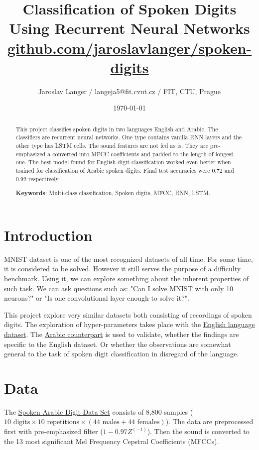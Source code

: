 \documentclass[a4paper,10pt]{article}
\title{Classification of Spoken Digits \\
       \vspace{0.05cm}
       \Large{Using Recurrent Neural Networks} \\
       \vspace{0.2cm}
       \normalsize{\href{https://github.com/jaroslavlanger/spoken-digits}{github.com/jaroslavlanger/spoken-digits}}
}
\date{\today}
\author{Jaroslav Langer / langeja5@fit.cvut.cz / FIT, CTU, Prague}
\begin{document}
\maketitle

\begin{abstract}

This project classifies spoken digits in two languages English and Arabic.
The classifiers are recurrent neural networks.
One type contains vanilla RNN layers and the other type has LSTM cells.
The sound features are not fed as is.
They are pre-emphasized a converted into MFCC coefficients and padded to the length of longest one.
The best model found for English digit classification worked even better when trained for classification of Arabic spoken digits.
Final test accuracies were 0.72 and 0.92 respectively.

\textbf{Keywords}: Multi-class classification, Spoken digits, MFCC, RNN, LSTM.
\end{abstract}

\section{Introduction}

MNIST dataset is one of the most recognized datasets of all time.
For some time, it is considered to be solved.
However it still serves the purpose of a difficulty benchmark.
Using it, we can explore something about the inherent properties of such task.
We can ask questions such as: "Can I solve MNIST with only 10 neurons?"
or "Is one convolutional layer enough to solve it?".

This project explore very similar datasets both consisting of recordings of spoken digits.
The exploration of hyper-parameters takes place with the \href{https://github.com/Jakobovski/free-spoken-digit-dataset}{English language dataset}.
The \href{https://archive.ics.uci.edu/ml/datasets/Spoken+Arabic+Digit}{Arabic counterpart} is used to validate, whether the findings are specific to the English dataset.
Or whether the observations are somewhat general to the task of spoken digit classification in disregard of the language.

\section{Data}

The \href{https://archive.ics.uci.edu/ml/datasets/Spoken+Arabic+Digit}{Spoken Arabic Digit Data Set}
consists of 8,800 samples ($10 \textrm{ digits} \times 10 \textrm{ repetitions} \times (44 \textrm{ males} + 44 \textrm{ females})$).
The data are preprocessed first with pre-emphasized filter ($1-0.97Z^{(-1)}$).
Then the sound is converted to the 13 most significant Mel Frequency Cepstral Coefficients (MFCCs).
\end{document}
